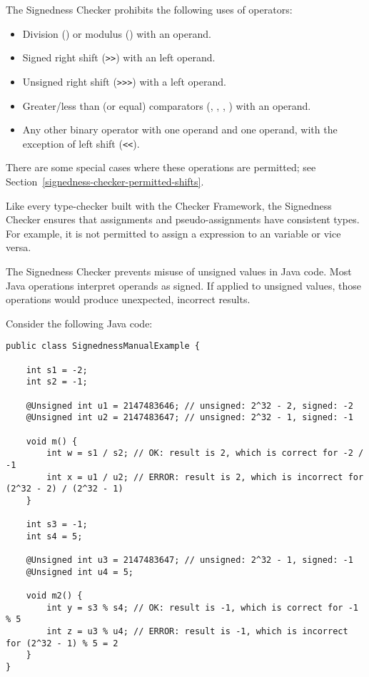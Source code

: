 The Signedness Checker prohibits the following uses of operators:

\begin{itemize}

    \item
    Division (\code{/}) or modulus (\code{\%}) with an 
    operand.
    \item
    Signed right shift (\verb|>>|) with an  left operand.
    \item
    Unsigned right shift (\verb|>>>|) with a  left operand.
    \item
    Greater/less than (or equal) comparators
    (\code{<}, \code{<=}, \code{>}, \code{>=}) with an 
    operand.
    \item
    Any other binary operator with one  operand and one
     operand, with the exception of left shift (\verb|<<|).

\end{itemize}

There are some special cases where these operations are permitted; see
Section~\ref{signedness-checker-permitted-shifts}.

Like every type-checker built with the Checker Framework, the Signedness
Checker ensures that assignments and pseudo-assignments have consistent types.
For example, it is not permitted to assign a  expression to an
 variable or vice versa.



The Signedness Checker prevents misuse of unsigned values in Java code.
Most Java operations interpret operands as signed.  If applied to unsigned
values, those operations would produce unexpected, incorrect results.

Consider the following Java code:

\begin{Verbatim}
public class SignednessManualExample {

    int s1 = -2;
    int s2 = -1;

    @Unsigned int u1 = 2147483646; // unsigned: 2^32 - 2, signed: -2
    @Unsigned int u2 = 2147483647; // unsigned: 2^32 - 1, signed: -1

    void m() {
        int w = s1 / s2; // OK: result is 2, which is correct for -2 / -1
        int x = u1 / u2; // ERROR: result is 2, which is incorrect for (2^32 - 2) / (2^32 - 1)
    }

    int s3 = -1;
    int s4 = 5;

    @Unsigned int u3 = 2147483647; // unsigned: 2^32 - 1, signed: -1
    @Unsigned int u4 = 5;

    void m2() {
        int y = s3 % s4; // OK: result is -1, which is correct for -1 % 5
        int z = u3 % u4; // ERROR: result is -1, which is incorrect for (2^32 - 1) % 5 = 2
    }
}
\end{Verbatim}

